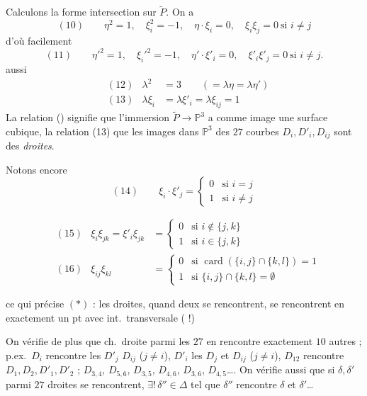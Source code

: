 \documentclass[11pt,a4paper]{article}
\begin{document}
Calculons la forme intersection sur $\widetilde{P}$. On a
\[
(10) \qquad \eta^2 = 1, \quad \xi_i^2 = -1, \quad \eta \cdot \xi_i = 0,
\quad \xi_i \xi_j = 0 \ \text{si } i \neq j
\]
d'où facilement
\[
(11) \qquad \eta'^2 = 1, \quad \xi_i'^2 = -1, \quad \eta' \cdot \xi'_i = 0,
\quad \xi'_i \xi'_j = 0 \ \text{si } i \neq j .
\]
 aussi
\[
\begin{aligned}
&(12) & \lambda^2 &= 3 \qquad (= \lambda\eta = \lambda\eta') \\
&(13) & \lambda\xi_i &= \lambda\xi'_i = \lambda\xi_{ij} = 1
\end{aligned}
\]
La relation () signifie que l'immersion $\widetilde{P} \to \mathbb{P}^3$
a comme image une surface cubique, la relation (13) que les images dans
$\mathbb{P}^3$ des $27$  courbes $D_i, D'_i, D_{ij}$
sont des \emph{droites}.

Notons encore
\[
(14) \qquad \xi_i \cdot \xi'_j =
\begin{cases} 0 & \text{si } i = j \\ 1 & \text{si } i \neq j \end{cases}
\]

\[
\begin{aligned}
&(15) & \xi_i \xi_{jk} = \xi'_i \xi_{jk} &=
\begin{cases} 0 & \text{si } i \notin \{j, k\} \\ 1 & \text{si } i \in \{j, k\} \end{cases} \\
&(16) & \xi_{ij} \xi_{kl} &=
\begin{cases} 0 & \text{si } \operatorname{card}(\{i,j\} \cap \{k,l\}) = 1 \\
1 & \text{si } \{i,j\} \cap \{k,l\} = \emptyset \end{cases}
\end{aligned}
\]

ce qui précise $(\ast)$ : les  droites, quand deux 
se rencontrent, se rencontrent en exactement un pt avec int.\ transversale
( !)

On vérifie de plus que ch.\ droite parmi les $27$ en rencontre exactement
$10$ autres ; p.ex.\ $D_i$ rencontre les $D'_j$ \struck{\ill{}} 
$D_{ij}$ ($j \neq i$), $D'_i$ les $D_j$ et $D_{ij}$ ($j \neq i$), $D_{12}$
rencontre $D_1, D_2, D'_1, D'_2$ ; $D_{3,4}$, $D_{5,6}$, $D_{3,5}$,
$D_{4,6}$, $D_{3,6}$, $D_{4,5}$…. On vérifie aussi que si $\delta,
\delta'$ parmi   $27$ droites se
rencontrent, $\exists!\, \delta'' \in \Delta$  tel que
$\delta''$ rencontre $\delta$ et $\delta'$…
\end{document}
